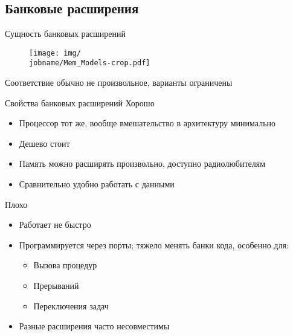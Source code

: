 \documentclass[xetex,aspectratio=43]{beamer}
\begin{document}
\subsection{Банковые расширения}

\begin{frame}{Сущность банковых расширений}
        \begin{figure}
            \texttt{[image: img/\\jobname/Mem\_Models-crop.pdf]}
        \end{figure}


        Соответствие обычно не произвольное, варианты ограничены
\end{frame}

\begin{frame}{Свойства банковых расширений}
        Хорошо

        \begin{itemize}
            \tightlist
            \item
            Процессор тот же, вообще вмешательство в архитектуру минимально
            \item
            Дешево стоит
            \item
            Память можно расширять произвольно, доступно радиолюбителям
            \item
            Сравнительно удобно работать с данными
        \end{itemize}

        Плохо

        \begin{itemize}
            \tightlist
            \item
            Работает не быстро
            \item
            Программируется через порты; тяжело менять банки кода, особенно для:

            \begin{itemize}
                \tightlist
                \item
                Вызова процедур
                \item
                Прерываний
                \item
                Переключения задач
            \end{itemize}
            \item
            Разные расширения часто несовместимы
        \end{itemize}
\end{frame}
\end{document}
